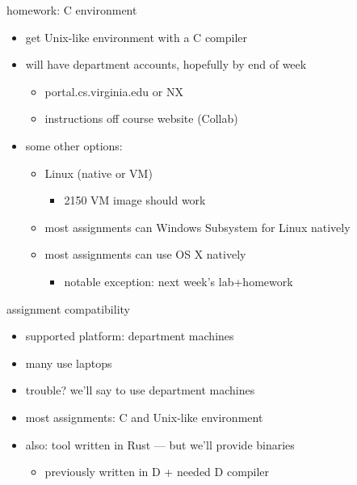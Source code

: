 \begin{frame}{homework: C environment}
    \begin{itemize}
    \item get Unix-like environment with a C compiler
    \item will have department accounts, hopefully by end of week
        \begin{itemize}
        \item portal.cs.virginia.edu or NX
        \item instructions off course website (Collab)
        \end{itemize}
    \item some other options:
        \begin{itemize}
        \item Linux (native or VM)
            \begin{itemize}
            \item 2150 VM image should work
            \end{itemize}
        \item most assignments can Windows Subsystem for Linux natively
        \item most assignments can use OS X natively
            \begin{itemize}
            \item notable exception: next week's lab+homework
            \end{itemize}
        \end{itemize}
    \end{itemize}
\end{frame}

\begin{frame}{assignment compatibility}
    \begin{itemize}
    \item supported platform: department machines
    \item many use laptops 
    \item trouble? we'll say to use department machines
    \vspace{.5cm}
    \item most assignments: C and Unix-like environment
    \item also: tool written in Rust --- but we'll provide binaries
        \begin{itemize}
        \item previously written in D + needed D compiler
        \end{itemize}
    \end{itemize}
\end{frame}
